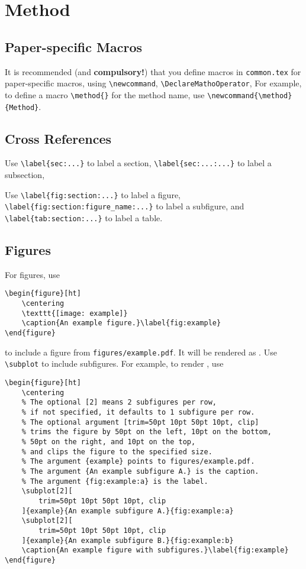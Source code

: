\section{Method}\label{sec:method}

\subsection{Paper-specific Macros}\label{sub:method:macros}

It is recommended (and \textbf{compulsory!})
that you define macros
in \verb|common.tex|
for paper-specific macros,
using \verb|\newcommand|, \verb|\DeclareMathoOperator|, \etc{}
For example,
to define a macro \verb|\method{}| for the method name,
use \verb|\newcommand{\method}{Method}|.


\subsection{Cross References}\label{sub:method:crossref}

Use \verb|\label{sec:...}|
to label a section,
\verb|\label{sec:...:...}|
to label a subsection,
\etc{}

Use \verb|\label{fig:section:...}| to label a figure,
\verb|\label{fig:section:figure_name:...}| to label a subfigure,
and \verb|\label{tab:section:...}| to label a table.

\subsection{Figures}\label{sub:method:figures}

For figures,
use
\begin{verbatim}
\begin{figure}[ht]
    \centering
    \texttt{[image: example]}
    \caption{An example figure.}\label{fig:example}
\end{figure}
\end{verbatim}
to include a figure
from \verb|figures/example.pdf|.
It will be rendered as .
Use \verb|\subplot| to include subfigures.
For example,
to render ,
use
\begin{verbatim}
\begin{figure}[ht]
    \centering
    % The optional [2] means 2 subfigures per row,
    % if not specified, it defaults to 1 subfigure per row.
    % The optional argument [trim=50pt 10pt 50pt 10pt, clip]
    % trims the figure by 50pt on the left, 10pt on the bottom,
    % 50pt on the right, and 10pt on the top,
    % and clips the figure to the specified size.
    % The argument {example} points to figures/example.pdf.
    % The argument {An example subfigure A.} is the caption.
    % The argument {fig:example:a} is the label.
    \subplot[2][
        trim=50pt 10pt 50pt 10pt, clip
    ]{example}{An example subfigure A.}{fig:example:a}
    \subplot[2][
        trim=50pt 10pt 50pt 10pt, clip
    ]{example}{An example subfigure B.}{fig:example:b}
    \caption{An example figure with subfigures.}\label{fig:example}
\end{figure}
\end{verbatim}

